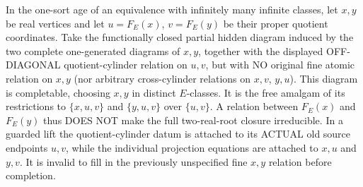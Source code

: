 \begin{remark}
\label{rem:typed-term-join-not-irreducible}
In the one-sort age of an equivalence
with infinitely many infinite classes,
let \(x,y\) be real vertices and let
\(u=F_E(x)\), \(v=F_E(y)\) be their
proper quotient coordinates. Take
the functionally closed partial
hidden diagram induced by the
two complete one-generated diagrams
of \(x,y\), together with the
displayed OFF-DIAGONAL quotient-cylinder
relation on \(u,v\), but with NO
original fine atomic relation on
\(x,y\) (nor arbitrary cross-cylinder
relations on \(x,v\), \(y,u\)).
This diagram is completable,
choosing \(x,y\) in distinct
\(E\)-classes. It is the free
amalgam of its restrictions
to \(\{x,u,v\}\) and
\(\{y,u,v\}\) over \(\{u,v\}\).
A relation between \(F_E(x)\) and
\(F_E(y)\) thus DOES NOT make
the full two-real-root closure
irreducible. In a guarded lift
the quotient-cylinder datum is
attached to its ACTUAL old source
endpoints \(u,v\), while the
individual projection equations
are attached to \(x,u\) and \(y,v\).
It is invalid to fill in the
previously unspecified fine
\(x,y\) relation before completion.
\end{remark}

